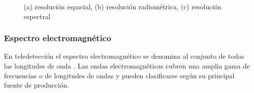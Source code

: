 \begin{figure}[htbp]
\centering
{}

\caption{(a) resolución espacial, (b) resolución radiométrica, (c) resolución espectral}\label{Fig:resoluciones}
\end{figure}


\subsubsection{Espectro electromagnético}

En teledetección el espectro electromagnético se denomina al conjunto de todas las longitudes de onda \citep{chuvieco}. Las ondas electromagnéticas cubren una amplia gama de frecuencias o de longitudes de ondas y pueden clasificarse según su principal fuente de producción. 

